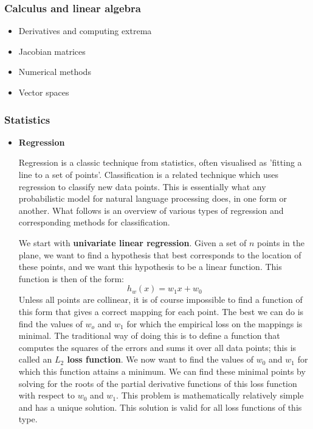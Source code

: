 \subsubsection{Calculus and linear algebra}
\label{sec:calculus}
\begin{itemize}
  \item Derivatives and computing extrema
  \item Jacobian matrices
  \item Numerical methods
  \item Vector spaces
\end{itemize}

\subsubsection{Statistics}
\label{sec:statistics}
\begin{itemize}
\item { 
    \textbf{Regression}

    Regression is a classic technique from statistics, often visualised as
    'fitting a line to a set of points'. Classification is a related
    technique which uses regression to classify new data points. This is
    essentially what any probabilistic model for natural language
    processing does, in one form or another. What follows is an overview
    of various types of regression and corresponding methods for
    classification.

    We start with \textbf{univariate linear regression}. Given a set
    of $n$ points in the plane, we want to find a hypothesis that best
    corresponds to the location of these points, and we want this
    hypothesis to be a linear function. This function is then of the form:
    \begin{equation}
      h_w(x) = w_1x + w_0
    \end{equation}
    Unless all points are collinear, it is of course impossible to
    find a function of this form that gives a correct mapping for each
    point. The best we can do is find the values of $w_o$ and $w_1$ for
    which the empirical loss on the mappings is minimal. The traditional
    way of doing this is to define a function that computes the squares of
    the errors and sums it over all data points; this is called an
    \textbf{$L_2$ loss function}. We now want to find the values of $w_0$
    and $w_1$ for which this function attains a minimum. We can find these
    minimal points by solving for the roots of the partial derivative
    functions of this loss function with respect to $w_0$ and $w_1$.  This
    problem is mathematically relatively simple and has a unique
    solution. This solution is valid for all loss functions of this type.

}
\end{itemize}
